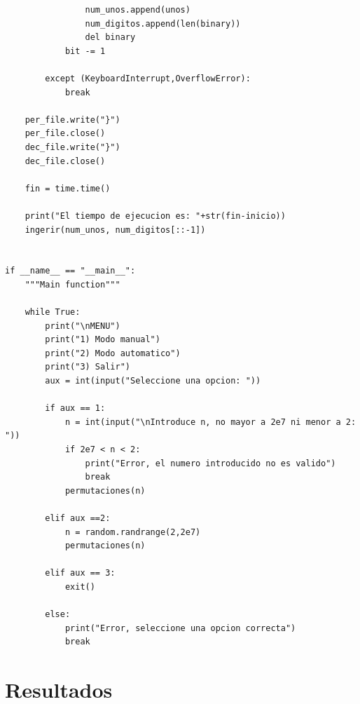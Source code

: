 \documentclass{article}
\begin{document}
\begin{lstlisting}
                num_unos.append(unos)  
                num_digitos.append(len(binary))
                del binary
            bit -= 1
            
        except (KeyboardInterrupt,OverflowError):
            break
    
    per_file.write("}")
    per_file.close()
    dec_file.write("}")
    dec_file.close()
    
    fin = time.time()
    
    print("El tiempo de ejecucion es: "+str(fin-inicio))
    ingerir(num_unos, num_digitos[::-1])
        
            
if __name__ == "__main__":
    """Main function"""
    
    while True:
        print("\nMENU")
        print("1) Modo manual")
        print("2) Modo automatico")
        print("3) Salir")
        aux = int(input("Seleccione una opcion: "))
            
        if aux == 1:
            n = int(input("\nIntroduce n, no mayor a 2e7 ni menor a 2: "))
            if 2e7 < n < 2:
                print("Error, el numero introducido no es valido")
                break
            permutaciones(n)
        
        elif aux ==2:
            n = random.randrange(2,2e7)
            permutaciones(n)
            
        elif aux == 3:
            exit()    
        
        else:
            print("Error, seleccione una opcion correcta")
            break

\end{lstlisting}

\section{Resultados}
\end{document}
